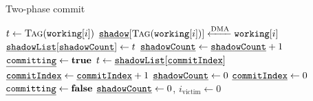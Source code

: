 \begin{algorithm}[t]
	\caption{Two-phase commit}
	\label{algo:commit}
	\scriptsize
	\begin{algorithmic}[1]
         
                \State $t \gets \Call{Tag}{\texttt{working}[i]}$
                \State $\texttt{\underline{shadow}}[\Call{Tag}{\texttt{working}[i]}] \xleftarrow{\text{DMA}} \texttt{working}[i]$
                \State $\texttt{\underline{shadowList}}[\texttt{\underline{shadowCount}}] \gets t$
                \State $\texttt{\underline{shadowCount}} \gets \texttt{\underline{shadowCount}} + 1$
            \EndFor
            \State {}
        \EndProcedure
            \State $\texttt{\underline{committing}} \gets \textbf{true}$
             
                \State $t \gets \texttt{\underline{shadowList}}[\texttt{\underline{commitIndex}}]$
                \State {}
                \State $\texttt{\underline{commitIndex}} \gets \texttt{\underline{commitIndex}} + 1$
            \EndWhile
            \State $\texttt{\underline{shadowCount}} \gets 0$
            \State $\texttt{\underline{commitIndex}} \gets 0$
            \State $\texttt{\underline{committing}} \gets \textbf{false}$
        \EndProcedure
         
             
            \EndIf 
            \State $\texttt{\underline{shadowCount}} \gets 0$, $i_\text{victim} \gets 0$
        \EndProcedure
	\end{algorithmic}
\end{algorithm}

%

